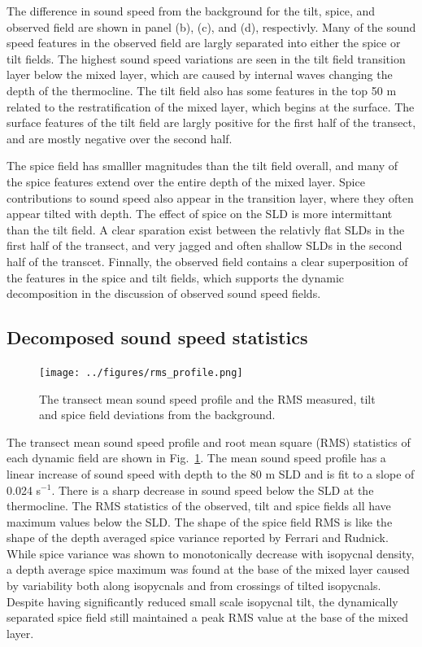 \documentclass[preprint,NumberedRefs]{JASA}
\begin{document}
The difference in sound speed from the background for the tilt, spice, and observed field are shown in panel (b), (c), and (d), respectivly. Many of the sound speed features in the observed field are largly separated into either the spice or tilt fields. The highest sound speed variations are seen in the tilt field transition layer below the mixed layer, which are caused by internal waves changing the depth of the thermocline\cite{colosi21}. The tilt field also has some features in the top 50 m related to the restratification of the mixed layer, which begins at the surface. The surface features of the tilt field are largly positive for the first half of the transect, and are mostly negative over the second half.

The spice field has smalller magnitudes than the tilt field overall, and many of the spice features extend over the entire depth of the mixed layer. Spice contributions to sound speed also appear in the transition layer, where they often appear tilted with depth. The effect of spice on the SLD is more intermittant than the tilt field. A clear sparation exist between the relativly flat SLDs in the first half of the transect, and very jagged and often shallow SLDs in the second half of the transcet. Finnally, the observed field contains a clear superposition of the features in the spice and tilt fields, which supports the dynamic decomposition in the discussion of observed sound speed fields.

\subsection{Decomposed sound speed statistics}
\begin{figure}
\texttt{[image: ../figures/rms\_profile.png]}
    \caption{\label{fig:c_rms}{The transect mean sound speed profile and the RMS measured, tilt and spice field deviations from the background.}}
\end{figure}

The transect mean sound speed profile and root mean square (RMS) statistics of each dynamic field are shown in Fig.~\ref{fig:c_rms}. The mean sound speed profile has a linear increase of sound speed with depth to the 80 m SLD and is fit to a slope of 0.024 s$^{-1}$. There is a sharp decrease in sound speed below the SLD at the thermocline. The RMS statistics of the observed, tilt and spice fields all have maximum values below the SLD. The shape of the spice field RMS is like the shape of the depth averaged spice variance reported by Ferrari and Rudnick\citep{ferrari2000}. While spice variance was shown to monotonically decrease with isopycnal density, a depth average spice maximum was found at the base of the mixed layer caused by variability both along isopycnals and from crossings of tilted isopycnals. Despite having significantly reduced small scale isopycnal tilt, the dynamically separated spice field still maintained a peak RMS value at the base of the mixed layer.
\end{document}
